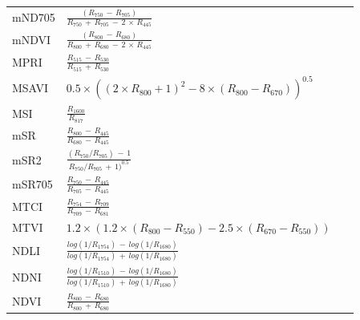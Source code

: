 \documentclass[remotesensing,article,accept,moreauthors,pdftex]{Definitions/mdpi}
\begin{document}
\begin{paracol}{2}
\begin{specialtable}[H]
{\begin{tabular}{lll}
		\midrule
		mND705          & $\frac{(R_{750}\,-\,R_{705})}{R_{750}\,+\,R_{705}\,-\,2\,\times\, R_{445}}$                                          &~\cite{sims2002}              \\
		mNDVI           & $\frac{(R_{800}\,-\,R_{680})}{R_{800}\,+\,R_{680}\,-\,2 \,\times\, R_{445}}$                                         &~\cite{sims2002}              \\
		MPRI            & $\frac{R_{515}\,-\,R_{530}}{R_{515}\,+\,R_{530}}$                                                            &~\cite{hernandez-clemente2011} \\
		MSAVI           & \parbox{5.5cm}{$0.5 \times ((2\times R_{800}+1)^2-8\times (R_{800}-R_{670}))^{0.5}$}                 &~\cite{qi1994}                 \\
		MSI             & $\frac{R_{1600}}{R_{817}}$                                                                           &~\cite{hunt1989}               \\
		mSR             & $\frac{R_{800}\,-\,R_{445}}{R_{680}\,-\,R_{445}}$                                                            &~\cite{sims2002}              \\
		mSR2            & $\frac{(R_{750}/R_{705})\,-\,1}{R_{750}/R_{705}\,+\,1)^{0.5}}$                                               &~\cite{chen1996}               \\
		mSR705          & $\frac{R_{750}\,-\,R_{445}}{R_{705}\,-\,R_{445}}$                                                            &~\cite{sims2002}              \\
		MTCI            & $\frac{R_{754}\,-\,R_{709}}{R_{709}\,-\,R_{681}}$                                                            &~\cite{dash2007}               \\
		\midrule
		MTVI            & \parbox{3.8cm}{$1.2 \times (1.2 \times (R_{800}-R_{550})-2.5 \times (R_{670}-R_{550}))$}             &~\cite{haboudane2002}          \\
		\midrule
		NDLI            & $\frac{log(1/R_{1754}) \,-\, log(1/R_{1680})}{log(1/R_{1754}) \,+\, log(1/R_{1680})}$                        &~\cite{serrano2002}            \\
		NDNI            & $\frac{log(1/R_{1510}) \,-\, log(1/R_{1680})}{log(1/R_{1510}) \,+\, log(1/R_{1680})}$                        &~\cite{serrano2002}            \\
		NDVI            & $\frac{R_{800}\,-\,R_{680}}{R_{800}\,+\,R_{680}}$                                                            &~\cite{tucker1979}             \\

\end{tabular}}
\end{specialtable}
\end{paracol}
\end{document}
